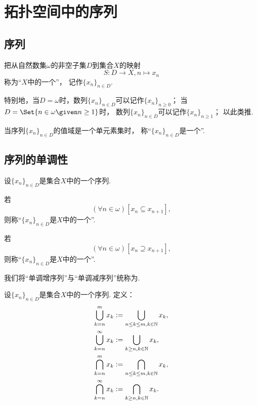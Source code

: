 \section{拓扑空间中的序列}
\subsection{序列}
\begin{definition}
把从自然数集\(\omega\)的非空子集\(D\)到集合\(X\)的映射\begin{equation*}
	S\colon D \to X, n \mapsto x_n
\end{equation*}称为“\(X\)中的一个”，
记作\(\{x_n\}_{n \in D}\).
\end{definition}

特别地，当\(D = \omega\)时，数列\(\{x_n\}_{n \in D}\)可以记作\(\{x_n\}_{n\geq0}\)；
当\(D = \Set{ n \in \omega \given n \geq 1}\)时，
数列\(\{x_n\}_{n \in D}\)可以记作\(\{x_n\}_{n\geq1}\)；
以此类推.

当序列\(\{x_n\}_{n \in D}\)的值域是一个单元素集时，
称“\(\{x_n\}_{n \in D}\)是一个”.

\subsection{序列的单调性}
\begin{definition}
设\(\{x_n\}_{n \in D}\)是集合\(X\)中的一个序列.

若\begin{equation*}
	(\forall n\in\omega)
	[x_n \subseteq x_{n+1}],
\end{equation*}
则称“\(\{x_n\}_{n \in D}\)是\(X\)中的一个”.

若\begin{equation*}
	(\forall n\in\omega)
	[x_n \supseteq x_{n+1}],
\end{equation*}
则称“\(\{x_n\}_{n \in D}\)是\(X\)中的一个”.

我们将“单调增序列”与“单调减序列”统称为.
\end{definition}

\begin{definition}
设\(\{x_n\}_{n \in D}\)是集合\(X\)中的一个序列.
定义：\begin{align*}
	\bigcup_{k=n}^m x_k
	&:=
	\bigcup_{n \leq k \leq m, k\in\mathbb{N}} x_k, \\
	\bigcup_{k=n}^\infty x_k
	&:=
	\bigcup_{k \geq n, k\in\mathbb{N}} x_k, \\
	\bigcap_{k=n}^m x_k
	&:=
	\bigcap_{n \leq k \leq m, k\in\mathbb{N}} x_k, \\
	\bigcap_{k=n}^\infty x_k
	&:=
	\bigcap_{k \geq n, k\in\mathbb{N}} x_k.
\end{align*}
\end{definition}

